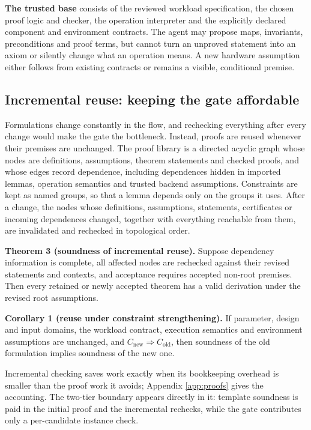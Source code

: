 \documentclass[11pt]{article}
\begin{document}
\textbf{The trusted base} consists of the reviewed workload specification, the chosen proof logic and checker, the operation interpreter and the explicitly declared component and environment contracts. The agent may propose maps, invariants, preconditions and proof terms, but cannot turn an unproved statement into an axiom or silently change what an operation means. A new hardware assumption either follows from existing contracts or remains a visible, conditional premise.

\subsection{Incremental reuse: keeping the gate affordable}\label{sec:reuse}

Formulations change constantly in the flow, and rechecking everything after every change would make the gate the bottleneck. Instead, proofs are reused whenever their premises are unchanged. The proof library is a directed acyclic graph whose nodes are definitions, assumptions, theorem statements and checked proofs, and whose edges record dependence, including dependences hidden in imported lemmas, operation semantics and trusted backend assumptions. Constraints are kept as named groups, so that a lemma depends only on the groups it uses. After a change, the nodes whose definitions, assumptions, statements, certificates or incoming dependences changed, together with everything reachable from them, are invalidated and rechecked in topological order.

\textbf{Theorem 3 (soundness of incremental reuse).} Suppose dependency information is complete, all affected nodes are rechecked against their revised statements and contexts, and acceptance requires accepted non-root premises. Then every retained or newly accepted theorem has a valid derivation under the revised root assumptions.

\textbf{Corollary 1 (reuse under constraint strengthening).} If parameter, design and input domains, the workload contract, execution semantics and environment assumptions are unchanged, and \(C_{\mathrm{new}}\Rightarrow C_{\mathrm{old}}\), then soundness of the old formulation implies soundness of the new one.

Incremental checking saves work exactly when its bookkeeping overhead is smaller than the proof work it avoids; Appendix \ref{app:proofs} gives the accounting. The two-tier boundary appears directly in it: template soundness is paid in the initial proof and the incremental rechecks, while the gate contributes only a per-candidate instance check.
\end{document}
